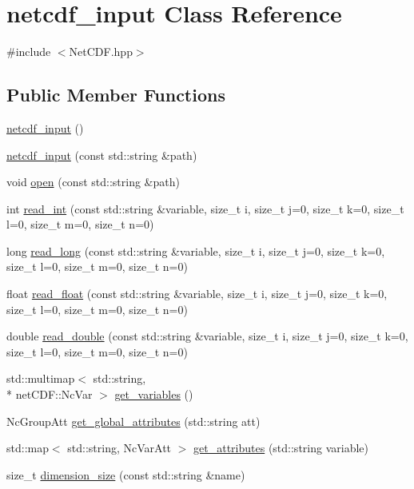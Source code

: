 \hypertarget{classnetcdf__input}{\section{netcdf\-\_\-input Class Reference}
\label{classnetcdf__input}
}


{\ttfamily \#include $<$Net\-C\-D\-F.\-hpp$>$}

\subsection*{Public Member Functions}
\begin{DoxyCompactItemize}
\item 
\hyperlink{classnetcdf__input_aed34aba0c7e7590dffb64417bb683ac8}{netcdf\-\_\-input} ()
\item 
\hyperlink{classnetcdf__input_acae75f119026d9ac5cc6814d0e94a908}{netcdf\-\_\-input} (const std\-::string \&path)
\item 
void \hyperlink{classnetcdf__input_a50314778372857039189a4f139448c68}{open} (const std\-::string \&path)
\item 
int \hyperlink{classnetcdf__input_a3d1d9f61be632b43137a249c3f4cc2e0}{read\-\_\-int} (const std\-::string \&variable, size\-\_\-t i, size\-\_\-t j=0, size\-\_\-t k=0, size\-\_\-t l=0, size\-\_\-t m=0, size\-\_\-t n=0)
\item 
long \hyperlink{classnetcdf__input_ad608df2a2400c2597fe20374d8555d11}{read\-\_\-long} (const std\-::string \&variable, size\-\_\-t i, size\-\_\-t j=0, size\-\_\-t k=0, size\-\_\-t l=0, size\-\_\-t m=0, size\-\_\-t n=0)
\item 
float \hyperlink{classnetcdf__input_a4e50818702ea85fe2bc2366b70383f22}{read\-\_\-float} (const std\-::string \&variable, size\-\_\-t i, size\-\_\-t j=0, size\-\_\-t k=0, size\-\_\-t l=0, size\-\_\-t m=0, size\-\_\-t n=0)
\item 
double \hyperlink{classnetcdf__input_a9b058e38c4a3cc0c8fa89597fbd8aaba}{read\-\_\-double} (const std\-::string \&variable, size\-\_\-t i, size\-\_\-t j=0, size\-\_\-t k=0, size\-\_\-t l=0, size\-\_\-t m=0, size\-\_\-t n=0)
\item 
std\-::multimap$<$ std\-::string, \\*
net\-C\-D\-F\-::\-Nc\-Var $>$ \hyperlink{classnetcdf__input_a6e474c0b56c8bc40c382b8c728a0d299}{get\-\_\-variables} ()
\item 
Nc\-Group\-Att \hyperlink{classnetcdf__input_a8174ba2c9f6f02574bbef5dd60703626}{get\-\_\-global\-\_\-attributes} (std\-::string att)
\item 
std\-::map$<$ std\-::string, Nc\-Var\-Att $>$ \hyperlink{classnetcdf__input_a0dcc20d4a2afd3b7b2be31514a549006}{get\-\_\-attributes} (std\-::string variable)
\item 
size\-\_\-t \hyperlink{classnetcdf__input_a02effe76acb8081382d78be1b0d60081}{dimension\-\_\-size} (const std\-::string \&name)
\end{DoxyCompactItemize}


